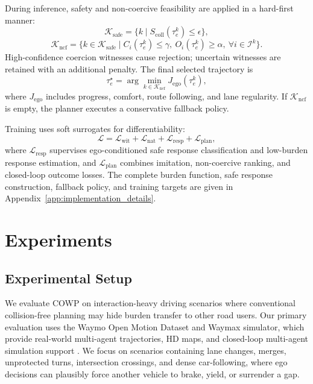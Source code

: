 \documentclass[10pt]{article}
\begin{document}
During inference, safety and non-coercive feasibility are applied in a hard-first manner:
\begin{equation}
    \mathcal{K}_{\mathrm{safe}}
    =
    \{k \mid S_{\mathrm{coll}}(\tau^k_e)\le \epsilon \},
\end{equation}
\begin{equation}
    \mathcal{K}_{\mathrm{ncf}}
    =
    \{k\in\mathcal{K}_{\mathrm{safe}}
    \mid
    C_i(\tau^k_e)\le \gamma,\ 
    O_i(\tau^k_e)\ge \alpha,\ 
    \forall i\in\mathcal{I}^k
    \}.
\end{equation}
High-confidence coercion witnesses cause rejection; uncertain witnesses are retained with an additional penalty. The final selected trajectory is
\begin{equation}
    \tau^\star_e
    =
    \arg\min_{k\in\mathcal{K}_{\mathrm{ncf}}}
    J_{\mathrm{ego}}(\tau^k_e),
\end{equation}
where $J_{\mathrm{ego}}$ includes progress, comfort, route following, and lane regularity. If $\mathcal{K}_{\mathrm{ncf}}$ is empty, the planner executes a conservative fallback policy.

Training uses soft surrogates for differentiability:
\begin{equation}
    \mathcal{L}
    =
    \mathcal{L}_{\mathrm{wit}}
    +
    \mathcal{L}_{\mathrm{nat}}
    +
    \mathcal{L}_{\mathrm{resp}}
    +
    \mathcal{L}_{\mathrm{plan}},
\end{equation}
where $\mathcal{L}_{\mathrm{resp}}$ supervises ego-conditioned safe response classification and low-burden response estimation, and $\mathcal{L}_{\mathrm{plan}}$ combines imitation, non-coercive ranking, and closed-loop outcome losses. The complete burden function, safe response construction, fallback policy, and training targets are given in Appendix~\ref{app:implementation_details}.



\section{Experiments}
\label{sec:experiments}

\subsection{Experimental Setup}
\label{sec:exp_setup}

We evaluate COWP on interaction-heavy driving scenarios where conventional collision-free planning may hide burden transfer to other road users. Our primary evaluation uses the Waymo Open Motion Dataset and Waymax simulator, which provide real-world multi-agent trajectories, HD maps, and closed-loop multi-agent simulation support \cite{ettinger2021large, gulino2023waymax}. We focus on scenarios containing lane changes, merges, unprotected turns, intersection crossings, and dense car-following, where ego decisions can plausibly force another vehicle to brake, yield, or surrender a gap.
\end{document}
